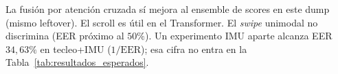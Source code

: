La fusión por atención cruzada sí mejora al ensemble de scores en este dump (mismo leftover). El scroll es útil en el 
Transformer. El \textit{swipe} unimodal no discrimina (EER próximo al $50\%$). Un experimento IMU aparte alcanza EER $34{,}63\%$ en tecleo+IMU ($1/\mathrm{EER}$); 
esa cifra no entra en la Tabla~\ref{tab:resultados_esperados}.
